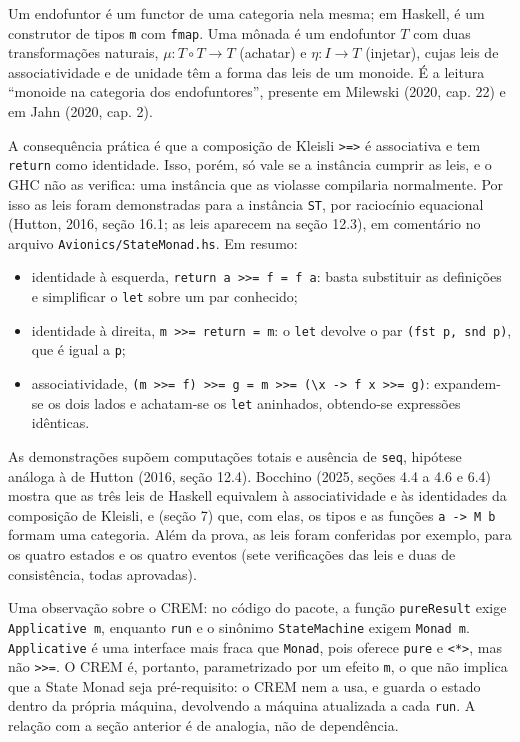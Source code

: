 \documentclass[12pt,a4paper]{article}
\begin{document}
Um endofuntor é um functor de uma categoria nela mesma; em Haskell, é um construtor de tipos \texttt{m} com \texttt{fmap}. Uma mônada é um endofuntor $T$ com duas transformações naturais, $\mu : T \circ T \to T$ (achatar) e $\eta : I \to T$ (injetar), cujas leis de associatividade e de unidade têm a forma das leis de um monoide. É a leitura ``monoide na categoria dos endofuntores'', presente em Milewski (2020, cap. 22) e em Jahn (2020, cap. 2).

A consequência prática é que a composição de Kleisli \texttt{>=>} é associativa e tem \texttt{return} como identidade. Isso, porém, só vale se a instância cumprir as leis, e o GHC não as verifica: uma instância que as violasse compilaria normalmente. Por isso as leis foram demonstradas para a instância \texttt{ST}, por raciocínio equacional (Hutton, 2016, seção 16.1; as leis aparecem na seção 12.3), em comentário no arquivo \texttt{Avionics/StateMonad.hs}. Em resumo:

\begin{itemize}
\item identidade à esquerda, \texttt{return a >>= f = f a}: basta substituir as definições e simplificar o \texttt{let} sobre um par conhecido;
\item identidade à direita, \texttt{m >>= return = m}: o \texttt{let} devolve o par \texttt{(fst p, snd p)}, que é igual a \texttt{p};
\item associatividade, \texttt{(m >>= f) >>= g = m >>= (\textbackslash x -> f x >>= g)}: expandem-se os dois lados e achatam-se os \texttt{let} aninhados, obtendo-se expressões idênticas.
\end{itemize}

As demonstrações supõem computações totais e ausência de \texttt{seq}, hipótese análoga à de Hutton (2016, seção 12.4). Bocchino (2025, seções 4.4 a 4.6 e 6.4) mostra que as três leis de Haskell equivalem à associatividade e às identidades da composição de Kleisli, e (seção 7) que, com elas, os tipos e as funções \texttt{a -> M b} formam uma categoria. Além da prova, as leis foram conferidas por exemplo, para os quatro estados e os quatro eventos (sete verificações das leis e duas de consistência, todas aprovadas).

Uma observação sobre o CREM: no código do pacote, a função \texttt{pureResult} exige \texttt{Applicative m}, enquanto \texttt{run} e o sinônimo \texttt{StateMachine} exigem \texttt{Monad m}. \texttt{Applicative} é uma interface mais fraca que \texttt{Monad}, pois oferece \texttt{pure} e \texttt{<*>}, mas não \texttt{>>=}. O CREM é, portanto, parametrizado por um efeito \texttt{m}, o que não implica que a State Monad seja pré-requisito: o CREM nem a usa, e guarda o estado dentro da própria máquina, devolvendo a máquina atualizada a cada \texttt{run}. A relação com a seção anterior é de analogia, não de dependência.
\end{document}

